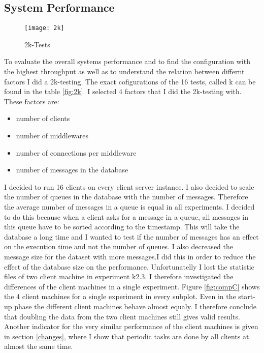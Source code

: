 \documentclass[
10pt, %
a4paper, %
oneside, %
headinclude,footinclude, %
BCOR5mm, %
]{scrartcl}
\begin{document}
\subsection{System Performance}
\label{sec:2k}


\begin{sidewaysfigure}[h]
\centering
\texttt{[image: 2k]}
\caption{2k-Tests}
\label{fig:2k}
\end{sidewaysfigure}



To evaluate the overall systems performance and to find the configuration with the highest throughput as well as to understand the relation between differnt factors I did a 2k-testing. The exact cofigurations of the 16 tests, called k\* can be found in the table \vref{fig:2k}. I selected 4 factors that I did the 2k-testing with. These factors are:
\begin{itemize}
\item number of clients
\item number of middlewares
\item number of connections per middleware
\item number of messages in the database
\end{itemize}

I decided to run 16 clients on every client server instance. I also decided to scale the number of queues in the database with the number of messages. Therefore the average number of messages in a queue is equal in all experiments. I decided to do this because when a client asks for a message in a queue, all messages in this queue have to be sorted according to the timestamp. This will take the database a long time and I wanted to test if the number of messages has an effect on the execution time and not the number of queues. I also decreased the message size for the dataset with more messages.I did this in order to reduce the effect of the database size on the performance.
Unfortunatelly I lost the statistic files of two client machine in experiment k2.3. I therefore investigated the differences of the client machines in a single experiment. Figure \vref{fig:compC} shows the 4 client machines for a single experiment in every subplot. Even in the start-up phase the different client machines behave almost equaly. I therefore conclude that doubling the data from the two client machines still gives valid results. Another indicator for the very similar performance of the client machines is given in section \vref{changes}, where I show that periodic tasks are done by all clients at almost the same time.
\end{document}
